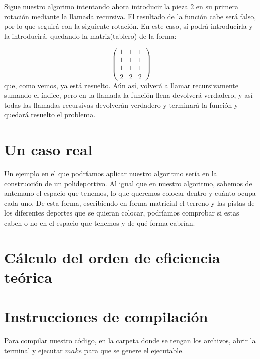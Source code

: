 \documentclass[a4paper, 11pt]{article}
\begin{document}
Sigue nuestro algorimo intentando ahora introducir la pieza 2 en su primera rotación mediante la llamada recursiva. El resultado de la función cabe será falso, por lo que seguirá con la siguiente rotación. En este caso, sí podrá introducirla y la introducirá, quedando la matriz(tablero) de la forma:

\[
\begin{pmatrix}
 1 & 1 & 1 \\
1 & 1 & 1\\
1 & 1 & 1\\
2 & 2 & 2
\end{pmatrix} 
\]
que, como vemos, ya está resuelto. Aún así, volverá a llamar recursivamente sumando el índice, pero en la llamada la función llena devolverá verdadero, y así todas las llamadas recursivas devolverán verdadero y terminará la función y quedará resuelto el problema.


\section{Un caso real}

Un ejemplo en el que podríamos aplicar nuestro algoritmo sería en la construcción de un polideportivo. Al igual que en nuestro algoritmo, sabemos de antemano el espacio que tenemos, lo que queremos colocar dentro y cuánto ocupa cada uno. De esta forma, escribiendo en forma matricial el terreno y las pistas de los diferentes deportes que se quieran colocar, podríamos comprobar si estas caben o no en el espacio que tenemos y de qué forma cabrían.

\section{Cálculo del orden de eficiencia teórica}



\section{Instrucciones de compilación}

Para compilar nuestro código, en la carpeta donde se tengan los archivos, abrir la terminal y ejecutar $make$ para que se genere el ejecutable.
\end{document}
